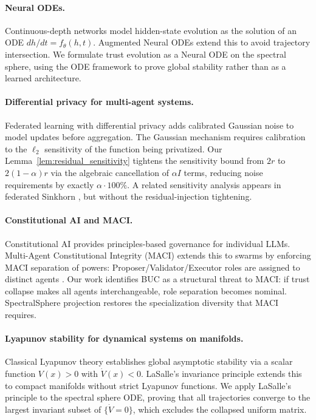 \paragraph{Neural ODEs.}
Continuous-depth networks \cite{chen2018neural} model hidden-state evolution as the
solution of an ODE $dh/dt = f_\theta(h, t)$.  Augmented Neural ODEs
\cite{dupont2019augmented} extend this to avoid trajectory intersection.  We formulate
trust evolution as a Neural ODE on the spectral sphere, using the ODE framework to prove
global stability rather than as a learned architecture.

\paragraph{Differential privacy for multi-agent systems.}
Federated learning with differential privacy \cite{mcmahan2018dp,geyer2017dp} adds
calibrated Gaussian noise to model updates before aggregation.  The Gaussian mechanism
\cite{dwork2014algorithmic} requires calibration to the $\ell_2$ sensitivity of the
function being privatized.  Our Lemma~\ref{lem:residual_sensitivity} tightens the
sensitivity bound from $2r$ to $2(1-\alpha)r$ via the algebraic cancellation of $\alpha I$
terms, reducing noise requirements by exactly $\alpha \cdot 100\%$.  A related
sensitivity analysis appears in federated Sinkhorn \cite{federated_sinkhorn2025}, but
without the residual-injection tightening.

\paragraph{Constitutional AI and MACI.}
Constitutional AI \cite{bai2022constitutional} provides principles-based governance for
individual LLMs.  Multi-Agent Constitutional Integrity (MACI) extends this to swarms by
enforcing MACI separation of powers: Proposer/Validator/Executor roles are assigned to
distinct agents \cite{acgs2025}.  Our work identifies BUC as a structural threat to MACI:
if trust collapse makes all agents interchangeable, role separation becomes nominal.
SpectralSphere projection restores the specialization diversity that MACI requires.

\paragraph{Lyapunov stability for dynamical systems on manifolds.}
Classical Lyapunov theory \cite{lyapunov1907} establishes global asymptotic stability via
a scalar function $V(x) > 0$ with $\dot{V}(x) < 0$.  LaSalle's invariance principle
\cite{lasalle1960some} extends this to compact manifolds without strict Lyapunov functions.
We apply LaSalle's principle to the spectral sphere ODE, proving that all trajectories
converge to the largest invariant subset of $\{\dot{V} = 0\}$, which excludes the
collapsed uniform matrix.
